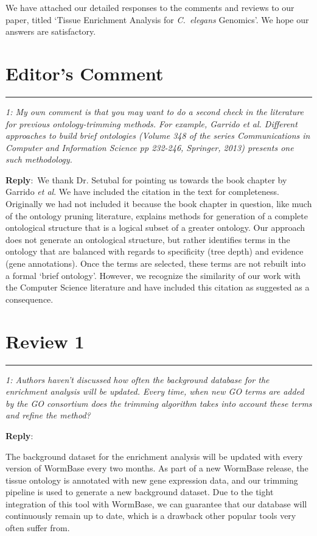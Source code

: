 \documentclass[12pt,stdletter,orderfromtodate,sigleft]{newlfm}
\newcommand{\pointRaised}[2]{\medskip \hrule \noindent 
                \textsl{{\fontseries{b} #1}: #2}}
\newcommand{\reply}{\noindent \textbf{Reply}:\ }
\begin{document}
\begin{newlfm}


We have attached our detailed responses to the comments and reviews to our paper, titled `Tissue Enrichment Analysis for \emph{C.~elegans} Genomics'. We hope our answers are satisfactory.  

\section{Editor's Comment}
 \pointRaised{1}{My own comment is that you may want to do a second check in the literature for previous ontology-trimming methods. For example, Garrido et al. Different approaches to build brief ontologies (Volume 348 of the series Communications in Computer and Information Science pp 232-246, Springer, 2013) presents one such methodology. }
 
 \reply{We thank Dr. Setubal for pointing us towards the book chapter by Garrido \emph{et al}. We have included the citation in the text for completeness. Originally we had not included it because the book chapter in question, like much of the ontology pruning literature, explains methods for generation of a complete ontological structure that is a logical subset of a greater ontology. Our approach does not generate an ontological structure, but rather identifies terms in the ontology that are balanced with regards to specificity (tree depth) and evidence (gene annotations). Once the terms are selected, these terms are not rebuilt into a formal `brief ontology'. However, we recognize the similarity of our work with the Computer Science literature and have included this citation as suggested as a consequence. 
  }


\section{Review 1}

\pointRaised{1}{Authors haven’t discussed how often the background database for the enrichment analysis will be updated. Every time, when new GO terms are added by the GO consortium does the trimming algorithm takes into account these terms and refine the method?
}

\reply{The background dataset for the enrichment analysis will be updated with every version of WormBase every two months. As part of a new WormBase release, the tissue ontology is annotated with new gene expression data, and our trimming pipeline is used to generate a new background dataset. Due to the tight integration of this tool with WormBase, we can guarantee that our database will continuously remain up to date, which is a drawback other popular tools very often suffer from. 

}
\end{newlfm}
\end{document}
